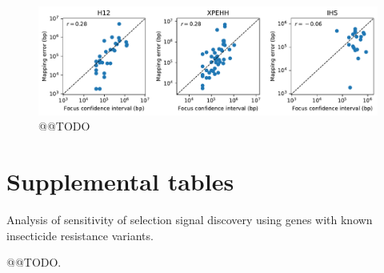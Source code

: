 \documentclass[a4paper,11pt,abstracton,hidelinks]{scrartcl}
\begin{document}
\clearpage
\begin{figure}[h!]
\centering
\includegraphics[width=1.1\textwidth,center]{artwork/chapter5/accuracy.pdf}
\caption{@@TODO
}
\label{fig:accuracy}
\end{figure}


\clearpage
\section{Supplemental tables}\label{sec:supplemental-tables}


\begin{table}[h]
\begin{center}
\begin{threeparttable}
%
\caption{Analysis of sensitivity of selection signal discovery using genes with known insecticide resistance variants.}
%
\label{table:sens}
%

%
\end{threeparttable}
\end{center}
\end{table}


\clearpage
\begin{table}[h]
\begin{center}
\begin{threeparttable}

\caption{@@TODO.}

\label{table:acc}



\end{threeparttable}
\end{center}
\end{table}
\end{document}
